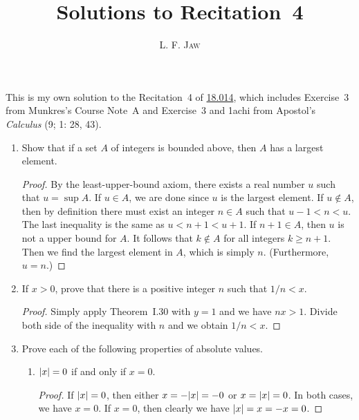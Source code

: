 \documentclass[a4paper]{article}
\title{Solutions to Recitation~4}
\author{L. F. \textsc{Jaw}}
\begin{document}
\maketitle

This is my own solution to the Recitation~4 of
\href{https://ocw.mit.edu/courses/mathematics/18-014-calculus-with-theory-fall-2010/recitations/}{18.014},
which includes Exercise~3 from Munkres's Course Note~A and Exercise~3 and
1achi from Apostol's \textit{Calculus} (9; 1: 28, 43).

\begin{enumerate}
\item Show that if a set \(A\) of integers is bounded above, then
  \(A\) has a largest element.

  \begin{proof}
    By the least-upper-bound axiom, there exists a real number \(u\) such
    that \(u = \sup A\).  If \(u \in A\), we are done since \(u\) is the
    largest element.  If \(u \notin A\), then by definition there must
    exist an integer \(n \in A\) such that \(u-1 < n < u\).  The last
    inequality is the same as \(u < n+1 < u+1\).  If \(n+1 \in A\), then
    \(u\) is not a upper bound for \(A\).  It follows that \(k \notin A\)
    for all integers \(k \ge n+1\).  Then we find the largest element in
    \(A\), which is simply \(n\).  (Furthermore, \(u = n\).)
  \end{proof}

\item If \(x > 0\), prove that there is a positive integer \(n\) such that
  \(1/n < x\).

  \begin{proof}
    Simply apply Theorem~I.30 with \(y = 1\) and we have \(nx > 1\).
    Divide both side of the inequality with \(n\) and we obtain
    \(1/n < x\).
  \end{proof}

\item Prove each of the following properties of absolute values.
  \begin{enumerate}
  \item \(\lvert x\rvert = 0\) if and only if \(x = 0\).

    \begin{proof}
      If \(\lvert x\rvert = 0\), then either \(x = -\lvert x\rvert = -0\) or
      \(x = \lvert x\rvert = 0\).  In both cases, we have \(x = 0\).  If
      \(x = 0\), then clearly we have \(\lvert x\rvert = x = -x = 0\).
    \end{proof}


\end{enumerate}
\end{enumerate}
\end{document}
